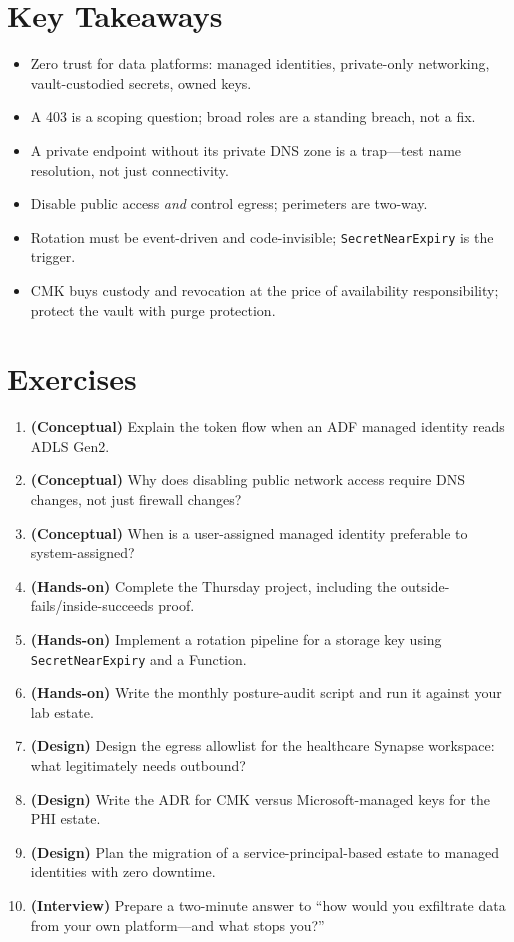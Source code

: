 \section*{Key Takeaways}
\begin{itemize}
    \item Zero trust for data platforms: managed identities, private-only networking, vault-custodied secrets, owned keys.
    \item A 403 is a scoping question; broad roles are a standing breach, not a fix.
    \item A private endpoint without its private DNS zone is a trap---test name resolution, not just connectivity.
    \item Disable public access \emph{and} control egress; perimeters are two-way.
    \item Rotation must be event-driven and code-invisible; \texttt{SecretNearExpiry} is the trigger.
    \item CMK buys custody and revocation at the price of availability responsibility; protect the vault with purge protection.
\end{itemize}

\section{Exercises}
\begin{enumerate}
    \item \textbf{(Conceptual)} Explain the token flow when an ADF managed identity reads ADLS Gen2.
    \item \textbf{(Conceptual)} Why does disabling public network access require DNS changes, not just firewall changes?
    \item \textbf{(Conceptual)} When is a user-assigned managed identity preferable to system-assigned?
    \item \textbf{(Hands-on)} Complete the Thursday project, including the outside-fails/inside-succeeds proof.
    \item \textbf{(Hands-on)} Implement a rotation pipeline for a storage key using \texttt{SecretNearExpiry} and a Function.
    \item \textbf{(Hands-on)} Write the monthly posture-audit script and run it against your lab estate.
    \item \textbf{(Design)} Design the egress allowlist for the healthcare Synapse workspace: what legitimately needs outbound?
    \item \textbf{(Design)} Write the ADR for CMK versus Microsoft-managed keys for the PHI estate.
    \item \textbf{(Design)} Plan the migration of a service-principal-based estate to managed identities with zero downtime.
    \item \textbf{(Interview)} Prepare a two-minute answer to ``how would you exfiltrate data from your own platform---and what stops you?''
\end{enumerate}

